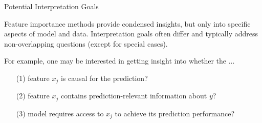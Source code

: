 \documentclass[10pt,compress,t,notes=noshow, xcolor=table]{beamer}
\begin{document}
\begin{frame}{Potential Interpretation Goals}

Feature importance methods provide condensed insights, but only into specific aspects of model and data. Interpretation goals often differ and typically address non-overlapping questions (except for special cases).

\lz 

For example, one may be interested in getting insight into whether the ...

\begin{enumerate}
    \item[(1)] feature $x_j$ is causal for the prediction?
    \item[(2)] feature $x_j$ contains prediction-relevant information about $y$?
    \item[(3)] model requires access to $x_j$ to achieve its prediction performance?
\end{enumerate}
\end{frame}
\end{document}

